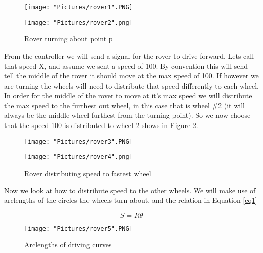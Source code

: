 \documentclass[12pt]{article}
\begin{document}
\begin{figure}[H]
 	\centering
  	\begin{minipage}[b]{0.45\textwidth}
		\texttt{[image: "Pictures/rover1".PNG]}
  	\end{minipage}
  	\hfill
  	\begin{minipage}[b]{0.45\textwidth}
    		\texttt{[image: "Pictures/rover2".png]}
  	\end{minipage}
  	\caption{Rover turning about point p}
	\label{r1}
\end{figure}

\noindent From the controller we will send a signal for the rover to drive forward. Lets call that speed X, and assume we sent a speed of 100. By convention this will send tell the middle of the rover it should move at the max speed of 100. If however we are turning the wheels will need to distribute that speed differently to each wheel. In order for the middle of the rover to move at it's max speed we will distribute the max speed to the furthest out wheel, in this case that is wheel \#2 (it will always be the middle wheel furthest from the turning point). So we now choose that the speed 100 is distributed to wheel 2 shows in Figure \ref{r2}.  

\begin{figure}[H]
 	\centering
  	\begin{minipage}[b]{0.45\textwidth}
		\texttt{[image: "Pictures/rover3".PNG]}
  	\end{minipage}
  	\hfill
  	\begin{minipage}[b]{0.45\textwidth}
    		\texttt{[image: "Pictures/rover4".png]}
  	\end{minipage}
  	\caption{Rover distributing speed to fastest wheel}
	\label{r2}
\end{figure}

\noindent Now we look at how to distribute speed to the other wheels. We will make use of arclengths of the circles the wheels turn about, and the relation in Equation \ref{eq1}

\begin{equation}
	S = R  \theta
	\label{eq1}
\end{equation}

\begin{figure}[H]
 	\centering
	\texttt{[image: "Pictures/rover5".PNG]}
 	\caption{Arclengths of driving curves}
	\label{r3}
\end{figure}
\end{document}
